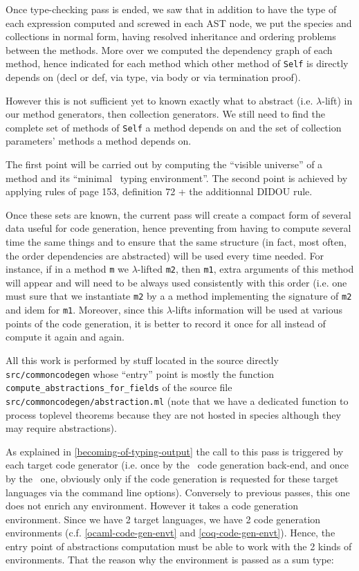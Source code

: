 \label{intermediate-abstractions}
Once type-checking pass is ended, we saw that in addition to have the
type of each expression computed and screwed in each AST node, we put
the species and collections in normal form, having resolved
inheritance and ordering problems between the methods. More over we
computed the dependency graph of each method, hence indicated for each
method which other method of {\tt Self} is directly depends on (decl
or def, via type, via body or via termination proof).

However this is not sufficient yet to known exactly what to abstract
(i.e. $\lambda$-lift) in our method generators, then collection
generators. We still need to find the complete set of methods of
{\tt Self} a method depends on and the set of collection parameters'
methods a method depends on.

The first point will be carried out by computing the ``visible
universe'' of a method and its ``minimal \coq\ typing
environment''. The second point is achieved by applying rules of page
153, definition 72 + the additionnal DIDOU rule.

Once these sets are known, the current
pass will create a compact form of several data useful for code
generation, hence preventing from having to compute several time the
same things and to ensure that the same structure (in fact, most
often, the order dependencies are abstracted) will be used every time
needed. For instance, if in a method {\tt m} we $\lambda$-lifted
{\tt m2}, then {\tt m1}, extra arguments of this method will appear
and will need to be always used consistently with this order (i.e. one
must sure that we instantiate {\tt m2} by a a method implementing the
signature of {\tt m2} and idem for {\tt m1}. Moreover, since this
$\lambda$-lifts information will be used at various points of the code
generation, it is better to record it once for all instead of compute
it again and again.

All this work is performed by stuff located in the source directly
{\tt src/commoncodegen} whose ``entry'' point is mostly the function
{\tt compute\_abstractions\_for\_fields} of the source file
{\tt src/commoncodegen/abstraction.ml} (note that we have a dedicated
function to process toplevel theorems because they are not hosted in
species although they may require abstractions).

As explained in \ref{becoming-of-typing-output} the call to this pass
is triggered by each target code generator (i.e. once by the
\ocaml\ code generation back-end, and once by the \coq\ one, obviously
only if the code generation is requested for these target languages
via the command line options). Conversely to previous passes, this one
does not enrich any environment. However it takes a code generation
environment. Since we have 2 target languages, we have 2 code
generation environments (c.f. \ref{ocaml-code-gen-envt} and
\ref{coq-code-gen-envt}). Hence, the entry point of abstractions
computation must be able to work with the 2 kinds of
environments. That the reason why the environment is passed as a sum
type:

